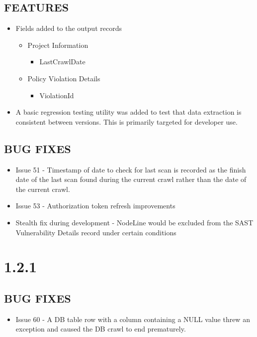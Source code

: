 \subsection*{FEATURES}
    \begin{itemize}
        \item Fields added to the output records
        \begin{itemize}
            \item Project Information
            \begin{itemize}
                \item LastCrawlDate
            \end{itemize}
        \end{itemize}
        \begin{itemize}
            \item Policy Violation Details
            \begin{itemize}
                \item ViolationId
            \end{itemize}
        \end{itemize}
        \item A basic regression testing utility was added to test that data extraction is consistent between versions.  This is primarily targeted for developer use.
    \end{itemize}

\subsection*{BUG FIXES}
    \begin{itemize}
        \item Issue 51 - Timestamp of date to check for last scan is recorded as the finish date of the last scan found during the current crawl rather than the date of the current crawl.
        \item Issue 53 - Authorization token refresh improvements
        \item Stealth fix during development - NodeLine would be excluded from the SAST Vulnerability Details record under certain conditions 
    \end{itemize}


\section{1.2.1}
\subsection*{BUG FIXES}
    \begin{itemize}
        \item Issue 60 - A DB table row with a column containing a NULL value threw an exception and caused the DB crawl to end prematurely.
    \end{itemize}


